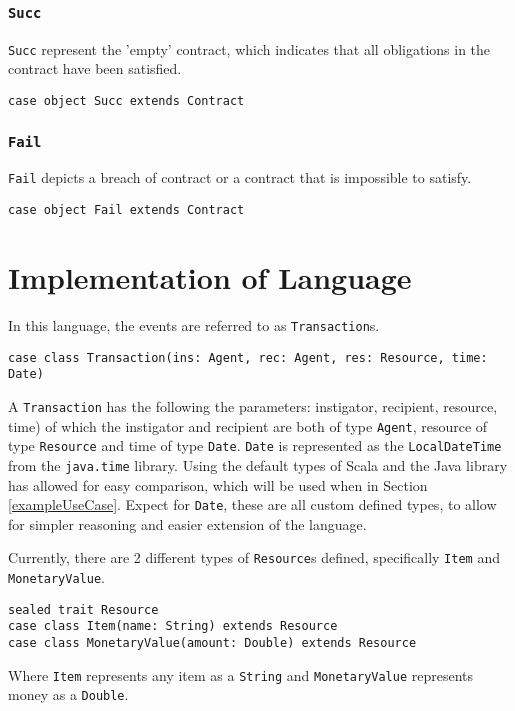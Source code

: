 \documentclass{ituthesis}
\begin{document}
\subsubsection{\texttt{\textbf{Succ}}}
\texttt{Succ} represent the 'empty' contract, which indicates that all obligations in the contract have been satisfied.
\begin{lstlisting}
case object Succ extends Contract
\end{lstlisting}

\subsubsection{\texttt{\textbf{Fail}}}
\texttt{Fail} depicts a breach of contract or a contract that is impossible to satisfy.
\begin{lstlisting}
case object Fail extends Contract
\end{lstlisting}

\section{Implementation of Language}
In this language, the events are referred to as \texttt{Transaction}s.
\begin{lstlisting}
case class Transaction(ins: Agent, rec: Agent, res: Resource, time: Date)
\end{lstlisting}
A \texttt{Transaction} has the following the parameters: instigator, recipient, resource, time) of which the instigator and recipient are both of type \texttt{Agent}, resource of type \texttt{Resource} and time of type \texttt{Date}. \texttt{Date} is represented as the \texttt{LocalDateTime} from the \texttt{java.time} library. Using the default types of Scala and the Java library has allowed for easy comparison, which will be used when in Section \ref{exampleUseCase}. Expect for \texttt{Date}, these are all custom defined types, to allow for simpler reasoning and easier extension of the language.

Currently, there are 2 different types of \texttt{Resource}s defined, specifically \texttt{Item} and \texttt{MonetaryValue}.
\begin{lstlisting}
sealed trait Resource
case class Item(name: String) extends Resource
case class MonetaryValue(amount: Double) extends Resource
\end{lstlisting}
Where \texttt{Item} represents any item as a \texttt{String} and \texttt{MonetaryValue} represents money as a \texttt{Double}.
\end{document}
